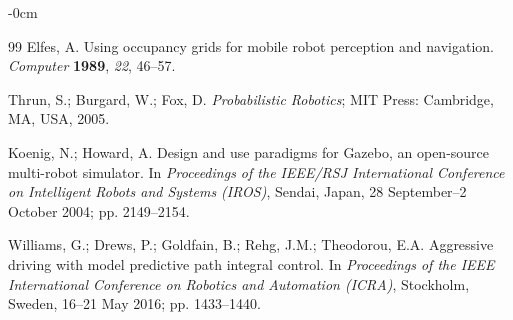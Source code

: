 \documentclass[sensors,article,submit,pdftex,moreauthors]{Definitions/mdpi}
\begin{document}
\begin{adjustwidth}{-\extralength}{0cm}
\begin{thebibliography}{99}
Elfes, A. Using occupancy grids for mobile robot perception and navigation. \textit{Computer} \textbf{1989}, \textit{22}, 46--57.

Thrun, S.; Burgard, W.; Fox, D. \textit{Probabilistic Robotics}; MIT Press: Cambridge, MA, USA, 2005.

Koenig, N.; Howard, A. Design and use paradigms for Gazebo, an open-source multi-robot simulator. In \textit{Proceedings of the IEEE/RSJ International Conference on Intelligent Robots and Systems (IROS)}, Sendai, Japan, 28 September--2 October 2004; pp. 2149--2154.

Williams, G.; Drews, P.; Goldfain, B.; Rehg, J.M.; Theodorou, E.A. Aggressive driving with model predictive path integral control. In \textit{Proceedings of the IEEE International Conference on Robotics and Automation (ICRA)}, Stockholm, Sweden, 16--21 May 2016; pp. 1433--1440.

\end{thebibliography}

%


\PublishersNote{}
\end{adjustwidth}
\end{document}
